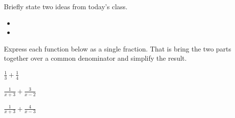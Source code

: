 \postClass

\begin{problem}
\item Briefly state two ideas from today's class.
  \begin{itemize}
  \item
  \item
  \end{itemize}
\item
  \begin{subproblem}
    \item
  \end{subproblem}
\end{problem}



\begin{problem}
\item Express each function below as a single fraction. That is bring
  the two parts together over a common denominator and simplify the
  result.
  \begin{subproblem}
  \item $\frac{1}{3} + \frac{1}{4}$
    \vfill
  \item $\frac{1}{x+3} + \frac{3}{x-2}$
    \vfill
  \item $\frac{1}{x+3} + \frac{4}{x-3}$
    \vfill
  \end{subproblem}
\end{problem}



